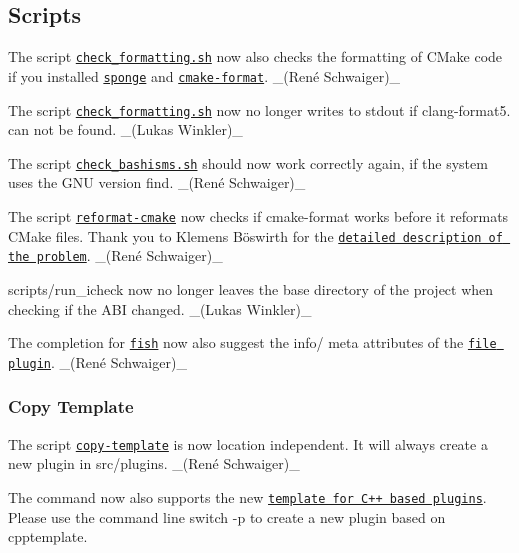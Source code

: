 \subsection*{Scripts}


\begin{DoxyItemize}
\item The script \href{https://master.libelektra.org/tests/shell/check_formatting.sh}{\tt {\ttfamily check\+\_\+formatting.\+sh}} now also checks the formatting of C\+Make code if you installed \href{https://joeyh.name/code/moreutils}{\tt {\ttfamily sponge}} and \href{https://github.com/cheshirekow/cmake_format}{\tt {\ttfamily cmake-\/format}}. \+\_\+(René Schwaiger)\+\_\+
\item The script \href{https://master.libelektra.org/tests/shell/check_formatting.sh}{\tt {\ttfamily check\+\_\+formatting.\+sh}} now no longer writes to stdout if clang-\/format5. can not be found. \+\_\+(\+Lukas Winkler)\+\_\+
\item The script \href{https://master.libelektra.org/tests/shell/check_bashisms.sh}{\tt {\ttfamily check\+\_\+bashisms.\+sh}} should now work correctly again, if the system uses the G\+NU version {\ttfamily find}. \+\_\+(René Schwaiger)\+\_\+
\item The script \href{https://master.libelektra.org/scripts/reformat-cmake}{\tt {\ttfamily reformat-\/cmake}} now checks if {\ttfamily cmake-\/format} works before it reformats C\+Make files. Thank you to Klemens Böswirth for the \href{https://github.com/ElektraInitiative/libelektra/pull/1903#discussion_r189332987}{\tt detailed description of the problem}. \+\_\+(René Schwaiger)\+\_\+
\item {\ttfamily scripts/run\+\_\+icheck} now no longer leaves the base directory of the project when checking if the A\+BI changed. \+\_\+(\+Lukas Winkler)\+\_\+
\item The completion for \href{http://fishshell.com}{\tt fish} now also suggest the {\ttfamily info/} meta attributes of the \href{https://www.libelektra.org/plugins/file}{\tt file plugin}. \+\_\+(René Schwaiger)\+\_\+
\end{DoxyItemize}

\subsubsection*{Copy Template}


\begin{DoxyItemize}
\item The script \href{https://master.libelektra.org/scripts/copy-template}{\tt {\ttfamily copy-\/template}} is now location independent. It will always create a new plugin in {\ttfamily src/plugins}. \+\_\+(René Schwaiger)\+\_\+
\item The command now also supports the new \href{https://www.libelektra.org/plugins/cpptemplate}{\tt template for C++ based plugins}. Please use the command line switch {\ttfamily -\/p} to create a new plugin based on {\ttfamily cpptemplate}.
\end{DoxyItemize}


